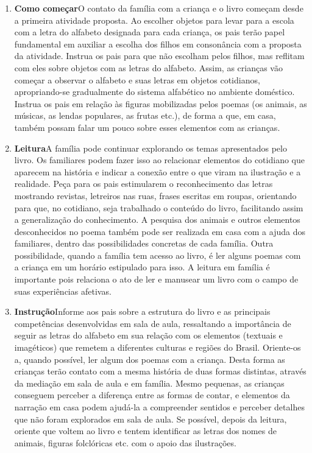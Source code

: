 \documentclass[11pt]{extarticle}
\begin{document}

\begin{enumerate}
\item \textbf{Como começar}\quad O contato da família com a criança e o livro começam desde a primeira atividade proposta. Ao escolher objetos para levar para a escola com a letra do alfabeto designada para cada criança, os pais terão papel fundamental em auxiliar a escolha dos filhos em consonância com a proposta da atividade. Instrua os pais para que não escolham pelos filhos, mas reflitam com eles sobre objetos com as letras do alfabeto. Assim, as crianças vão começar a observar o alfabeto e suas letras em objetos cotidianos, apropriando-se gradualmente do sistema alfabético no ambiente doméstico. Instrua os pais em relação às figuras mobilizadas pelos poemas (os animais, as músicas, as lendas populares, as frutas etc.), de forma a que, em casa, também possam falar um pouco sobre esses elementos com as crianças.

\item \textbf{Leitura}\quad A família pode continuar 
explorando os temas apresentados pelo livro. Os familiares podem fazer isso ao relacionar 
elementos do cotidiano que aparecem na história e indicar a conexão 
entre o que viram na ilustração e a realidade. Peça para os pais estimularem o reconhecimento das letras mostrando revistas, letreiros nas ruas, frases escritas em roupas, orientando para que, no cotidiano, seja trabalhado o conteúdo do livro, facilitando assim a generalização do conhecimento. A pesquisa dos animais e outros elementos desconhecidos no poema também pode ser realizada em casa com a ajuda dos familiares, dentro das possibilidades concretas de cada família. Outra possibilidade, quando a família tem acesso ao livro, é ler alguns poemas com a criança em um horário estipulado para isso. A leitura em família é importante pois relaciona o ato de ler e manusear um livro com o campo de suas experiências afetivas.

\item \textbf{Instrução}\quad Informe aos pais sobre a estrutura do livro e as principais competências desenvolvidas em sala de aula, ressaltando a importância de seguir as letras do alfabeto em sua relação com os elementos (textuais e imagéticos) que remetem a diferentes culturas e regiões do Brasil.
Oriente-os a, quando possível, ler algum dos poemas com a criança.
Desta forma as crianças terão contato com a mesma história de duas formas distintas, através da mediação em sala de aula e em família. 
Mesmo pequenas, as crianças conseguem perceber a diferença entre 
as formas de contar, e elementos da narração em casa podem ajudá-la a compreender 
sentidos e perceber detalhes que não foram explorados em sala de aula. Se possível, depois da leitura, oriente 
que voltem ao livro e tentem identificar as letras dos nomes de animais, figuras folclóricas etc. com o apoio das  ilustrações. 


\end{enumerate}
\end{document}

